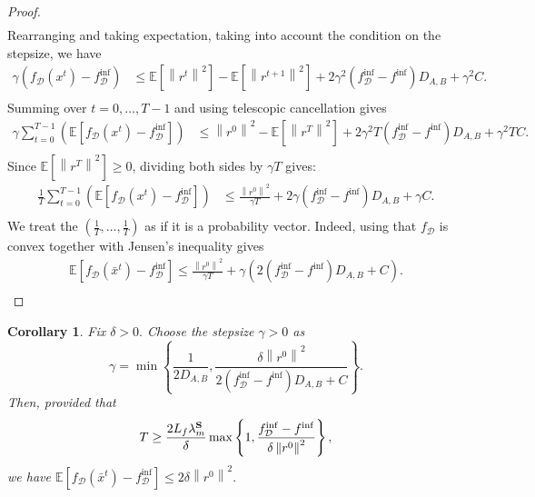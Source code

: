 \documentclass{article}
\newcommand{\bb}{\mathbb}
\newcommand{\norm}[1]{\left\| #1 \right\|}
\newcommand{\Exp}[1]{{\bb E}\left[#1\right]}
\theoremstyle{plain}
\newtheorem{corollary}{Corollary}
\newcommand{\tf}{f_{\mathcal{D}}}
\newcommand{\mS}{{\bf S}}
\theoremstyle{plain}
\theoremstyle{definition}
\theoremstyle{remark}
\begin{document}
\begin{proof}
\begin{equation*}
\begin{split}
	\end{split}
\end{equation*}
Rearranging and taking expectation, taking into account the condition on the stepsize, we have
\begin{equation*}
	\begin{split}
		\gamma\left(\tf(x^t) - \tf^{\inf}\right) &\leq \Exp{\norm{r^t}^2} - \Exp{\norm{r^{t+1}}^2}
		+ 2\gamma^2\left(\tf^{\inf} - f^{\inf}\right)D_{A,B} + \gamma^2C.\\
	\end{split}
\end{equation*}
Summing over $t = 0,\ldots, T-1$ and using telescopic cancellation gives
\begin{equation*}
	\begin{split}
		\gamma\sum_{t=0}^{T-1}\left(\Exp{\tf(x^t) - \tf^{\inf}}\right) &\leq \norm{r^0}^2 - \Exp{\norm{r^{T}}^2}
		+ 2\gamma^2T\left(\tf^{\inf} - f^{\inf}\right)D_{A,B}+\gamma^2T C.\\
	\end{split}
\end{equation*}
Since $\Exp{\norm{r^{T}}^2} \geq 0$, dividing both sides by $\gamma T$ gives:
\begin{equation*}
	\begin{split}
		\frac{1}{T}\sum_{t=0}^{T-1}\left(\Exp{\tf(x^t) - \tf^{\inf}}\right) &\leq \frac{\norm{r^0}^2}{\gamma T} + 2\gamma\left(\tf^{\inf} - f^{\inf}\right)D_{A,B}+\gamma C.\\
	\end{split}
\end{equation*}
We treat the $\left(\frac{1}{T},\ldots,\frac{1}{T}\right)$ as if it is a probability vector.
Indeed, using that $\tf$ is convex together with Jensen's inequality gives
\begin{equation*}
	\begin{split}
		\Exp{\tf(\bar{x}^t) - \tf^{\inf}} \leq \frac{\norm{r^0}^2}{\gamma T} + \gamma\left(2\left(\tf^{\inf} - f^{\inf}\right)D_{A,B}+ C\right).\\
	\end{split}
\end{equation*}
\end{proof}
\begin{corollary}
	Fix $\delta>0.$ Choose the stepsize $\gamma>0$ as
	\begin{equation*}
		\gamma = \min\left\lbrace \frac{1}{2D_{A,B}}, \frac{\delta\norm{r^0}^2}{2\left(\tf^{\inf} - f^{\inf}\right)D_{A,B}+ C} \right\rbrace.
	\end{equation*}
	Then, provided that
	\begin{equation*}
		T\geq \frac{2L_f\lambda_m^{\mS}}{\delta}\max\left\lbrace 1, \frac{\tf^{\inf} - f^{\inf}}{\delta\norm{r^0}^2}\right\rbrace,
	\end{equation*}
	we have $\Exp{\tf(\bar{x}^t) - \tf^{\inf}}\leq 2\delta\norm{r^0}^2.$
\end{corollary}
\end{document}
